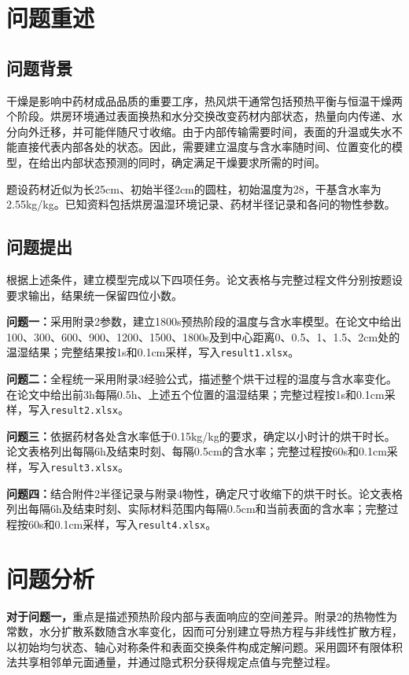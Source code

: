 \section{问题重述}
\subsection{问题背景}
干燥是影响中药材成品品质的重要工序，热风烘干通常包括预热平衡与恒温干燥两个阶段。烘房环境通过表面换热和水分交换改变药材内部状态，热量向内传递、水分向外迁移，并可能伴随尺寸收缩。由于内部传输需要时间，表面的升温或失水不能直接代表内部各处的状态。因此，需要建立温度与含水率随时间、位置变化的模型，在给出内部状态预测的同时，确定满足干燥要求所需的时间。

题设药材近似为长25\unit{cm}、初始半径2\unit{cm}的圆柱，初始温度为28\celsius，干基含水率为2.55\unit{kg/kg}。已知资料包括烘房温湿环境记录、药材半径记录和各问的物性参数。

\subsection{问题提出}
根据上述条件，建立模型完成以下四项任务。论文表格与完整过程文件分别按题设要求输出，结果统一保留四位小数。

\textbf{问题一：}采用附录2参数，建立1800\unit{s}预热阶段的温度与含水率模型。在论文中给出100、300、600、900、1200、1500、1800\unit{s}及到中心距离0、0.5、1、1.5、2\unit{cm}处的温湿结果；完整结果按1\unit{s}和0.1\unit{cm}采样，写入\texttt{result1.xlsx}。

\textbf{问题二：}全程统一采用附录3经验公式，描述整个烘干过程的温度与含水率变化。在论文中给出前3\unit{h}每隔0.5\unit{h}、上述五个位置的温湿结果；完整过程按1\unit{s}和0.1\unit{cm}采样，写入\texttt{result2.xlsx}。

\textbf{问题三：}依据药材各处含水率低于0.15\unit{kg/kg}的要求，确定以小时计的烘干时长。论文表格列出每隔6\unit{h}及结束时刻、每隔0.5\unit{cm}的含水率；完整过程按60\unit{s}和0.1\unit{cm}采样，写入\texttt{result3.xlsx}。

\textbf{问题四：}结合附件2半径记录与附录4物性，确定尺寸收缩下的烘干时长。论文表格列出每隔6\unit{h}及结束时刻、实际材料范围内每隔0.5\unit{cm}和当前表面的含水率；完整过程按60\unit{s}和0.1\unit{cm}采样，写入\texttt{result4.xlsx}。

\section{问题分析}
\textbf{对于问题一，}重点是描述预热阶段内部与表面响应的空间差异。附录2的热物性为常数，水分扩散系数随含水率变化，因而可分别建立导热方程与非线性扩散方程，以初始均匀状态、轴心对称条件和表面交换条件构成定解问题。采用圆环有限体积法共享相邻单元面通量，并通过隐式积分获得规定点值与完整过程\cite{dasilva2014}。

